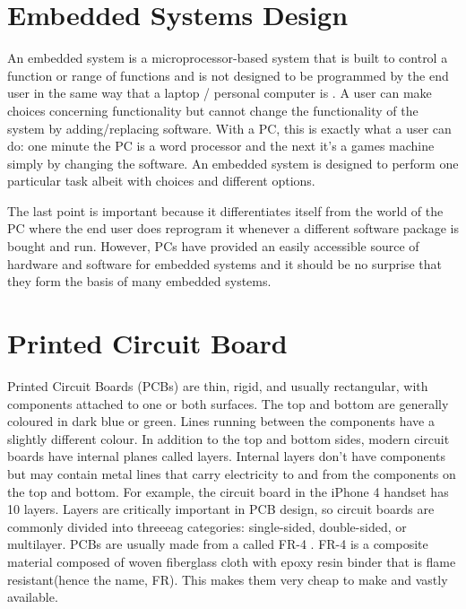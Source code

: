 \section{Embedded Systems Design} 


An embedded system is a microprocessor-based system
that is built to control a function or range of functions and is not designed to be
programmed by the end user in the same way that a laptop / personal computer is \citet{embedded}. A user can make choices
concerning functionality but cannot change the functionality of the system by
adding/replacing software. With a PC, this is exactly what a user can do: one minute
the PC is a word processor and the next it's a games machine simply by changing the
software. An embedded system is designed to perform one particular task albeit with
choices and different options.

The last point is important because it differentiates itself from the world of the PC
where the end user does reprogram it whenever a different software package is bought
and run. However, PCs have provided an easily accessible source of hardware and
software for embedded systems and it should be no surprise that they form the basis
of many embedded systems.

\section{Printed Circuit Board} 

Printed Circuit Boards (PCBs) are thin, rigid, and usually rectangular, with
components attached to one or both surfaces. The top and bottom are generally
coloured in dark blue or green. Lines running between the components have a slightly
different colour. In addition to the top and bottom sides, modern circuit boards have
internal planes called layers. Internal layers don’t have components but may contain
metal lines that carry electricity to and from the components on the top and bottom.
For example, the circuit board in the iPhone 4 handset has 10 layers. Layers are
critically important in PCB design, so circuit boards are commonly divided into threeeag
categories: single-sided, double-sided, or multilayer. PCBs are usually made from a called FR-4 \citep{eagle}. FR-4 is a composite material composed of woven fiberglass cloth with epoxy resin binder that is flame resistant(hence the name, FR). This makes them very cheap to make and vastly available.

%
%
%
%
%
%

